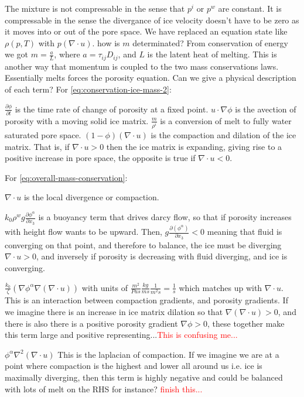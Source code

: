 \documentclass[a4paper,12pt]{article}
\newcommand{\pd}[2]{\frac{\partial #1}{\partial #2}}
\begin{document}
\begin{outline}
\1 The mixture is not compressable in the sense that $p^i$ or $p^w$ are constant. It is compressable in the sense the divergance of ice velocity doesn't have to be zero as it moves into or out of the pore space. We have replaced an equation state like $\rho(p,T)$ with $p(\nabla \cdot u)$.
\1 how is $m$ determinated? From conservation of energy we got $m = \frac{a}{L}$, where $a=\tau_{ij}D_{ij}$, and $L$ is the latent heat of melting. This is another way that momentum is coupled to the two mass conservations laws. Essentially melts forces the porosity equation.
\1 Can we give a physical description of each term? For \eqref{eq:conservation-ice-mass-2}:

\2 $\pd{\phi}{t}$ is the time rate of change of porosity at a fixed point.
\2 $u \cdot \nabla \phi$ is the avection of porosity with a moving solid ice matrix.
\2 $\frac{m}{\rho^i}$ is a conversion of melt to fully water saturated pore space.
\2 $(1 - \phi)(\nabla \cdot u)$ is the compaction and dilation of the ice matrix. That is, if $\nabla \cdot u > 0$ then the ice matrix is expanding, giving rise to a positive increase in pore space, the opposite is true if $\nabla \cdot u < 0$.

\1 For \eqref{eq:overall-mass-conservation}:

\2 $\nabla \cdot u$ is the local divergence or compaction.

\2 $k_0\rho^wg\pd{\phi^\alpha}{x_3}$ is a buoyancy term that drives darcy flow, so that if porosity increases with height flow wants to be upward. Then, $g \pd{(\phi^\alpha)}{x_3} < 0$ meaning that fluid is converging on that point, and therefore to balance, the ice must be diverging $\nabla \cdot u > 0$, and inversely if porosity is decreasing with fluid diverging, and ice is converging.

\2 $\frac{k_0}{\zeta}(\nabla \phi^\alpha\nabla(\nabla \cdot u))$ with units of $\frac{m^2}{Pa s} \frac{kg}{ms}\frac{1}{m^2s} = \frac{1}{s}$ which matches up with $\nabla \cdot u$. This is an interaction between compaction gradients, and porosity gradients. If we imagine there is an increase in ice matrix dilation so that $\nabla(\nabla \cdot u) > 0$, and there is also there is a positive porosity gradient $\nabla \phi > 0$, these together make this term large and positive representing...\textcolor{red}{This is confusing me...}

\2 $\phi^\alpha \nabla^2(\nabla \cdot u)$ This is the laplacian of compaction. If we imagine we are at a point where compaction is the highest and lower all around us i.e. ice is maximally diverging, then this term is highly negative and could be balanced with lots of melt on the RHS for instance? \textcolor{red}{finish this...}


\end{outline}
\end{document}
